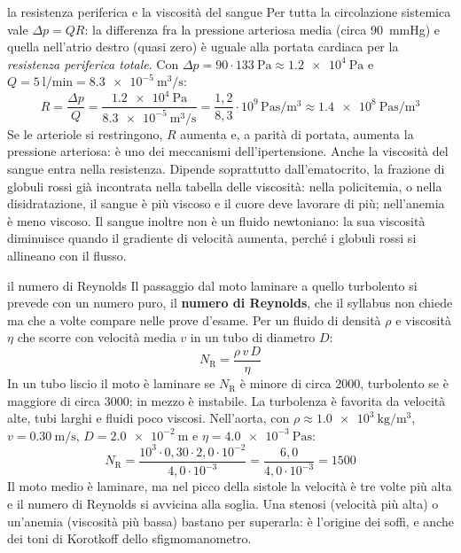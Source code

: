 \begin{applicazione}{la resistenza periferica e la viscosità del sangue}
Per tutta la circolazione sistemica vale $\Delta p = QR$: la differenza fra la pressione arteriosa media (circa \SI{90}{\mmHg}) e quella nell'atrio destro (quasi zero) è uguale alla portata cardiaca per la \emph{resistenza periferica totale}. Con $\Delta p = 90 \cdot \SI{133}{\pascal} \approx \SI{1,2e4}{\pascal}$ e $Q = \SI{5}{\litre\per\minute} = \SI{8,3e-5}{\metre\cubed\per\second}$:
\[
  R = \frac{\Delta p}{Q} = \frac{\SI{1,2e4}{\pascal}}{\SI{8,3e-5}{\metre\cubed\per\second}} = \frac{1{,}2}{8{,}3} \cdot 10^{9}\,\si{\pascal\second\per\metre\cubed} \approx \SI{1,4e8}{\pascal\second\per\metre\cubed}
\]
Se le arteriole si restringono, $R$ aumenta e, a parità di portata, aumenta la pressione arteriosa: è uno dei meccanismi dell'ipertensione. Anche la viscosità del sangue entra nella resistenza. Dipende soprattutto dall'ematocrito, la frazione di globuli rossi già incontrata nella tabella delle viscosità: nella policitemia, o nella disidratazione, il sangue è più viscoso e il cuore deve lavorare di più; nell'anemia è meno viscoso. Il sangue inoltre non è un fluido newtoniano: la sua viscosità diminuisce quando il gradiente di velocità aumenta, perché i globuli rossi si allineano con il flusso.
\end{applicazione}

\begin{approfondimento}{il numero di Reynolds}
Il passaggio dal moto laminare a quello turbolento si prevede con un numero puro, il \textbf{numero di Reynolds}, che il syllabus non chiede ma che a volte compare nelle prove d'esame. Per un fluido di densità $\rho$ e viscosità $\eta$ che scorre con velocità media $v$ in un tubo di diametro $D$:
\[
  N_\text{R} = \frac{\rho\,v\,D}{\eta}
\]
In un tubo liscio il moto è laminare se $N_\text{R}$ è minore di circa 2000, turbolento se è maggiore di circa 3000; in mezzo è instabile. La turbolenza è favorita da velocità alte, tubi larghi e fluidi poco viscosi. Nell'aorta, con $\rho \approx \SI{1,0e3}{\kilo\gram\per\metre\cubed}$, $v = \SI{0,30}{\metre\per\second}$, $D = \SI{2,0e-2}{\metre}$ e $\eta = \SI{4,0e-3}{\pascal\second}$:
\[
  N_\text{R} = \frac{10^{3} \cdot 0{,}30 \cdot 2{,}0 \cdot 10^{-2}}{4{,}0 \cdot 10^{-3}} = \frac{6{,}0}{4{,}0 \cdot 10^{-3}} = 1500
\]
Il moto medio è laminare, ma nel picco della sistole la velocità è tre volte più alta e il numero di Reynolds si avvicina alla soglia. Una stenosi (velocità più alta) o un'anemia (viscosità più bassa) bastano per superarla: è l'origine dei soffi, e anche dei toni di Korotkoff dello sfigmomanometro.
\end{approfondimento}

